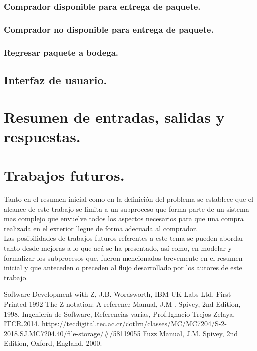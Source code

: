 \documentclass[12pt,a4paper]{article}
\begin{document}
\subsubsection{Comprador disponible para entrega de paquete.}

\subsubsection{Comprador no disponible para entrega de paquete.}

\subsubsection{Regresar paquete a bodega.}

\subsection{Interfaz de usuario.}

\section{Resumen de entradas, salidas y respuestas.}

\section{Trabajos futuros.}
Tanto en el resumen inicial como en la definición del problema se establece que el alcance de este trabajo se limita a un subproceso que forma parte de un sistema mas complejo que envuelve todos los aspectos necesarios para que una compra realizada en el exterior llegue de forma adecuada al comprador.\\[\baselineskip]
\indent Las posibilidades de trabajos futuros referentes a este tema se pueden abordar tanto desde mejoras a lo que acá se ha presentado, así como, en modelar y formalizar los subprocesos que, fueron mencionados brevemente en el resumen inicial y que anteceden o preceden al flujo desarrollado por los autores de este trabajo.


\newpage
\begin{thebibliography}{00}
 Software Development with Z, J.B. Wordsworth, IBM UK Labs Ltd. First Printed 1992
 The Z notation: A reference Manual, J.M . Spivey, 2nd Edition, 1998.
 Ingeniería de Software, Referencias varias, Prof.Ignacio Trejos Zelaya, ITCR.2014. \url{https://tecdigital.tec.ac.cr/dotlrn/classes/MC/MC7204/S-2-2018.SJ.MC7204.40/file-storage/#/58119055}
 Fuzz Manual, J.M. Spivey, 2nd Edition, Oxford, England, 2000.
\end{thebibliography}
\end{document}
